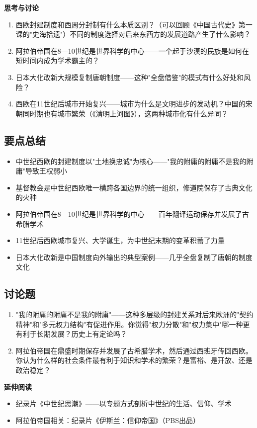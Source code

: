 \documentclass[a4paper,12pt]{ctexart}
\begin{document}
\vspace{0.3cm}
{\large\textcolor{orange!80!black}{\textbf{思考与讨论}}}
\begin{enumerate}
  \item 西欧封建制度和西周分封制有什么本质区别？（可以回顾《中国古代史》第一课的"史海拾遗"）不同的制度选择对后来东西方的发展道路产生了什么影响？
  \item 阿拉伯帝国在8—10世纪是世界科学的中心——一个起于沙漠的民族是如何在短时间内成为学术霸主的？
  \item 日本大化改新大规模复制唐朝制度——这种"全盘借鉴"的模式有什么好处和风险？
  \item 西欧在11世纪后城市开始复兴——城市为什么是文明进步的发动机？中国的宋朝同时期也有城市繁荣（《清明上河图》），这两种城市化有什么异同？
\end{enumerate}

\subsection*{要点总结}
\begin{itemize}
  \item 中世纪西欧的封建制度以"土地换忠诚"为核心——"我的附庸的附庸不是我的附庸"导致王权弱小
  \item 基督教会是中世纪西欧唯一横跨各国边界的统一组织，修道院保存了古典文化的火种
  \item 阿拉伯帝国在8—10世纪是世界科学的中心——百年翻译运动保存并发展了古希腊学术
  \item 11世纪后西欧城市复兴、大学诞生，为中世纪末期的变革积蓄了力量
  \item 日本大化改新是中国制度向外输出的典型案例——几乎全盘复制了唐朝的制度文化
\end{itemize}

\subsection*{讨论题}
\begin{enumerate}
  \item "我的附庸的附庸不是我的附庸"——这种多层级的封建关系对后来欧洲的"契约精神"和"多元权力结构"有促进作用。你觉得"权力分散"和"权力集中"哪一种更有利于长期发展？历史上有定论吗？
  \item 阿拉伯帝国在鼎盛时期保存并发展了古希腊学术，然后通过西班牙传回西欧。你认为什么样的社会条件最有利于知识和学术的繁荣？是富裕、是开放、还是政治稳定？
\end{enumerate}

\vspace{0.3cm}
\textcolor{blue!70!black}{\textbf{延伸阅读}}
\begin{itemize}
  \item 纪录片《中世纪思潮》——以专题方式剖析中世纪的生活、信仰、学术
  \item 阿拉伯帝国相关：纪录片《伊斯兰：信仰帝国》（PBS出品）
\end{itemize}
\end{document}
